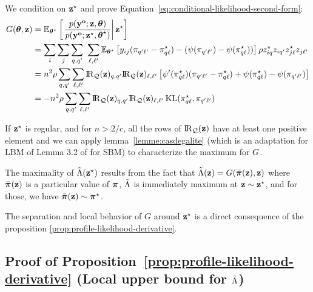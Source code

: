\proofbegin
We condition on $\mathbf{z}^\star$ and prove Equation~\eqref{eq:conditional-likelihood-second-form}:
\begin{align*}
  \G(\btheta, \bz) & = \Esp_{\bthetas} \left[ \left. \frac{\prob(\byo; \bz,\btheta)}{\prob(\byo; \bzs,\bthetas)} \right| \bzs \right] \\
  & = \sum_{\ii} \sum_{\jj} \sum_{\kk,\kp}\ \sum_{\el,\lp} \Esp_{\bthetas}\left[ y_{ij}  (\al_{\kp\lp} - \alskl) - (\norm(\al_{\kp\lp}) - \norm(\alskl)) \right] \rho \z^\vrai_{\ii\kk} \z_{\ii\kp} \z^\vrai_{\jj\el} \z_{\jj\lp} \\
  & = \n^2 \rho \sum_{\kk, \kp} \sum_{\el, \lp}  \RQbz_{\kk,\kp} \RQbz_{\el, \lp} \left[ \normp(\alskl) (\al_{\kp\lp} - \alskl) +  \norm(\alskl) - \norm(\al_{\kp\lp}) \right] \\
  & = - \n^2 \rho \sum_{\kk,\kp} \sum_{\el,\lp} \RQbz_{\kk,\kp} \RQbz_{\el, \lp} \KL(\al^\vrai_{\kk\el}, \al_{\kp\lp})
\end{align*}

If $\mathbf{z}^\star$ is regular, and for $n > 2/c$, all the rows of $\RQbz$ have
at least one positive element and we can apply
lemma~\ref{lemme:casdegalite} (which is an adaptation for LBM of Lemma 3.2 of \cite{bickel2013asymptotic} for SBM) to characterize the maximum for
$G$.

The maximality  of $\tilde{\Lambda}(\mathbf{z}^\star)$ results from the fact that $\tilde{\Lambda}(\mathbf{z}) = G(\bar{\boldsymbol{\pi}}(\mathbf{z}), \mathbf{z})$ where
$\bar{\boldsymbol{\pi}}(\mathbf{z})$ is a particular value of $\boldsymbol{\pi}$, $\tilde{\Lambda}$ is
immediately maximum at $\mathbf{z} \sim \mathbf{z}^\star$, and for those, we have $\bar{\boldsymbol{\pi}}(\mathbf{z}) \sim \boldsymbol{\pi}^\star$.

The separation and local behavior of $G$ around $\mathbf{z}^\star$ is a direct consequence of the proposition \ref{prop:profile-likelihood-derivative}.

\proofend

\subsection{Proof of Proposition~\ref{prop:profile-likelihood-derivative} (Local upper bound for  $\tilde{\Lambda}$)}

